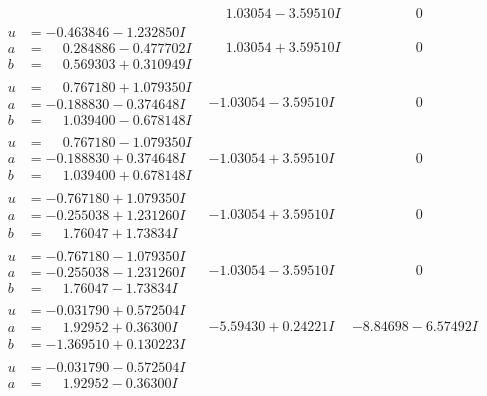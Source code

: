 \documentclass[1p]{elsarticle_modified}
\theoremstyle{definition}
\begin{document}
$$\begin{array}{c|c|c}
 & \phantom{-}1.03054 - 3.59510 I & \phantom{-0.000000 } 0 \\ \hline\begin{aligned}
u &= -0.463846 - 1.232850 I \\
a &= \phantom{-}0.284886 - 0.477702 I \\
b &= \phantom{-}0.569303 + 0.310949 I\end{aligned}
 & \phantom{-}1.03054 + 3.59510 I & \phantom{-0.000000 } 0 \\ \hline\begin{aligned}
u &= \phantom{-}0.767180 + 1.079350 I \\
a &= -0.188830 - 0.374648 I \\
b &= \phantom{-}1.039400 - 0.678148 I\end{aligned}
 & -1.03054 - 3.59510 I & \phantom{-0.000000 } 0 \\ \hline\begin{aligned}
u &= \phantom{-}0.767180 - 1.079350 I \\
a &= -0.188830 + 0.374648 I \\
b &= \phantom{-}1.039400 + 0.678148 I\end{aligned}
 & -1.03054 + 3.59510 I & \phantom{-0.000000 } 0 \\ \hline\begin{aligned}
u &= -0.767180 + 1.079350 I \\
a &= -0.255038 + 1.231260 I \\
b &= \phantom{-}1.76047 + 1.73834 I\end{aligned}
 & -1.03054 + 3.59510 I & \phantom{-0.000000 } 0 \\ \hline\begin{aligned}
u &= -0.767180 - 1.079350 I \\
a &= -0.255038 - 1.231260 I \\
b &= \phantom{-}1.76047 - 1.73834 I\end{aligned}
 & -1.03054 - 3.59510 I & \phantom{-0.000000 } 0 \\ \hline\begin{aligned}
u &= -0.031790 + 0.572504 I \\
a &= \phantom{-}1.92952 + 0.36300 I \\
b &= -1.369510 + 0.130223 I\end{aligned}
 & -5.59430 + 0.24221 I & -8.84698 - 6.57492 I \\ \hline\begin{aligned}
u &= -0.031790 - 0.572504 I \\
a &= \phantom{-}1.92952 - 0.36300 I \\

\end{aligned}
\end{array}$$
\end{document}
